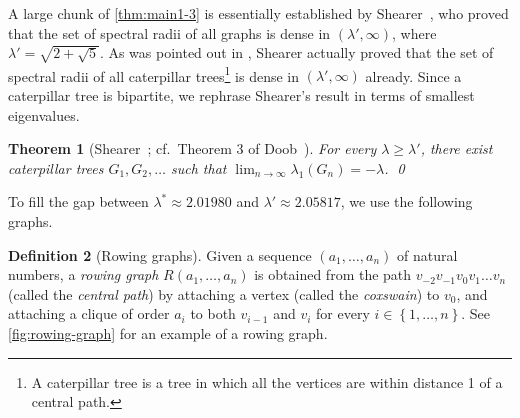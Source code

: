 \documentclass[11pt]{article}
\newtheorem{theorem}{Theorem}[section]
\theoremstyle{definition}
\newtheorem{definition}[theorem]{Definition}
\theoremstyle{remark}
\newcommand{\sset}[1]{\left\{{#1}\right\}}
\newcommand{\la}{\lambda}
\begin{document}
A large chunk of \cref{thm:main1-3} is essentially established by Shearer~\cite{S89}, who proved that the set of spectral radii of all graphs is dense in $(\la', \infty)$, where $\la' = \sqrt{2+\sqrt{5}}$. As was pointed out in \cite{D89}, Shearer actually proved that the set of spectral radii of all caterpillar trees\footnote{A caterpillar tree is a tree in which all the vertices are within distance 1 of a central path.} is dense in $(\la', \infty)$ already. Since a caterpillar tree is bipartite, we rephrase Shearer's result in terms of smallest eigenvalues.

\begin{theorem}[Shearer~\cite{S89}; cf.\ Theorem 3 of Doob~\cite{D89}] \label{thm:shearer}
    For every $\la \ge \la'$, there exist caterpillar trees $G_1, G_2, \dots$ such that $\lim_{n\to\infty} \la_1(G_n) = -\la$. \qed
\end{theorem}

To fill the gap between $\la^* \approx 2.01980$ and $\la' \approx 2.05817$, we use the following graphs.

\begin{definition}[Rowing graphs]
    Given a sequence $(a_1, \dots, a_n)$ of natural numbers, a \emph{rowing graph} $R(a_1, \dots, a_n)$ is obtained from the path $v_{-2}v_{-1}v_{0}v_{1}\dots v_{n}$ (called the \emph{central path}) by attaching a vertex (called the \emph{coxswain}) to $v_0$, and attaching a clique of order $a_i$ to both $v_{i-1}$ and $v_i$ for every $i \in \sset{1, \dots, n}$. See \cref{fig:rowing-graph} for an example of a rowing graph.
\end{definition}
\end{document}
